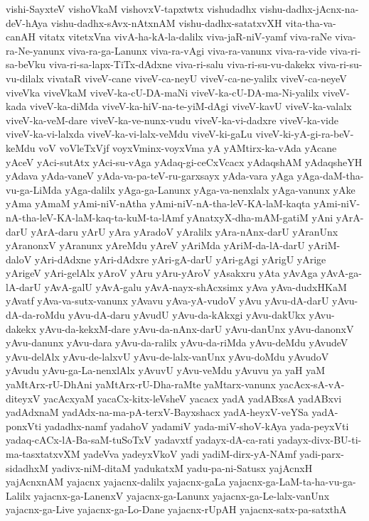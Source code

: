 {vishi-SayxteV
vishoVkaM
vishovxV-tapxtwtx
vishudadhx
vishu-dadhx-jAcnx-na-deV-hAya
vishu-dadhx-sAvx-nAtxnAM
vishu-dadhx-satatxvXH
vita-tha-va-canAH
vitatx
vitetxVna
vivA-ha-kA-la-dalilx
viva-jaR-niV-yamf
viva-raNe
viva-ra-Ne-yanunx
viva-ra-ga-Lanunx
viva-ra-vAgi
viva-ra-vanunx
viva-ra-vide
viva-ri-sa-beVku
viva-ri-sa-lapx-TiTx-dAdxne
viva-ri-salu
viva-ri-su-vu-dakekx
viva-ri-su-vu-dilalx
vivataR
viveV-cane
viveV-ca-neyU
viveV-ca-ne-yalilx
viveV-ca-neyeV
viveVka
viveVkaM
viveV-ka-cU-DA-maNi
viveV-ka-cU-DA-ma-Ni-yalilx
viveV-kada
viveV-ka-diMda
viveV-ka-hiV-na-te-yiM-dAgi
viveV-kavU
viveV-ka-valalx
viveV-ka-veM-dare
viveV-ka-ve-nunx-vudu
viveV-ka-vi-dadxre
viveV-ka-vide
viveV-ka-vi-lalxda
viveV-ka-vi-lalx-veMdu
viveV-ki-gaLu
viveV-ki-yA-gi-ra-beV-keMdu
voV
voVleTxVjf
voyxVminx-voyxVma
yA
yAMtirx-ka-vAda
yAcane
yAceV
yAci-sutAtx
yAci-su-vAga
yAdaq-gi-ceCxVcacx
yAdaqshAM
yAdaqsheYH
yAdava
yAda-vaneV
yAda-va-pa-teV-ru-garxsayx
yAda-vara
yAga
yAga-daM-tha-vu-ga-LiMda
yAga-dalilx
yAga-ga-Lanunx
yAga-va-nenxlalx
yAga-vanunx
yAke
yAma
yAmaM
yAmi-niV-nAtha
yAmi-niV-nA-tha-leV-KA-laM-kaqta
yAmi-niV-nA-tha-leV-KA-laM-kaq-ta-kuM-ta-lAmf
yAnatxyX-dha-mAM-gatiM
yAni
yArA-darU
yArA-daru
yArU
yAra
yAradoV
yAralilx
yAra-nAnx-darU
yAranUnx
yAranonxV
yAranunx
yAreMdu
yAreV
yAriMda
yAriM-da-lA-darU
yAriM-daloV
yAri-dAdxne
yAri-dAdxre
yAri-gA-darU
yAri-gAgi
yArigU
yArige
yArigeV
yAri-gelAlx
yAroV
yAru
yAru-yAroV
yAsakxru
yAta
yAvAga
yAvA-ga-lA-darU
yAvA-galU
yAvA-galu
yAvA-nayx-shAcxsimx
yAva
yAva-dudxHKaM
yAvatf
yAva-va-sutx-vanunx
yAvavu
yAva-yA-vudoV
yAvu
yAvu-dA-darU
yAvu-dA-da-roMdu
yAvu-dA-daru
yAvudU
yAvu-da-kAkxgi
yAvu-dakUkx
yAvu-dakekx
yAvu-da-kekxM-dare
yAvu-da-nAnx-darU
yAvu-danUnx
yAvu-danonxV
yAvu-danunx
yAvu-dara
yAvu-da-ralilx
yAvu-da-riMda
yAvu-deMdu
yAvudeV
yAvu-delAlx
yAvu-de-lalxvU
yAvu-de-lalx-vanUnx
yAvu-doMdu
yAvudoV
yAvudu
yAvu-ga-La-nenxlAlx
yAvuvU
yAvu-veMdu
yAvuvu
ya
yaH
yaM
yaMtArx-rU-DhAni
yaMtArx-rU-Dha-raMte
yaMtarx-vanunx
yacAcx-sA-vA-diteyxV
yacAcxyaM
yacaCx-kitx-leVsheV
yacacx
yadA
yadABxsA
yadABxvi
yadAdxnaM
yadAdx-na-ma-pA-terxV-Bayxshacx
yadA-heyxV-veYSa
yadA-ponxVti
yadadhx-namf
yadahoV
yadamiV
yada-miV-shoV-kAya
yada-peyxVti
yadaq-cACx-lA-Ba-saM-tuSoTxV
yadavxtf
yadayx-dA-ca-rati
yadayx-divx-BU-ti-ma-tasxtatxvXM
yadeVva
yadeyxVkoV
yadi
yadiM-dirx-yA-NAmf
yadi-parx-sidadhxM
yadivx-niM-ditaM
yadukatxM
yadu-pa-ni-Satusx
yajAcnxH
yajAcnxnAM
yajacnx
yajacnx-dalilx
yajacnx-gaLa
yajacnx-ga-LaM-ta-ha-vu-ga-Lalilx
yajacnx-ga-LanenxV
yajacnx-ga-Lanunx
yajacnx-ga-Le-lalx-vanUnx
yajacnx-ga-Live
yajacnx-ga-Lo-Dane
yajacnx-rUpAH
yajacnx-satx-pa-satxthA
}
